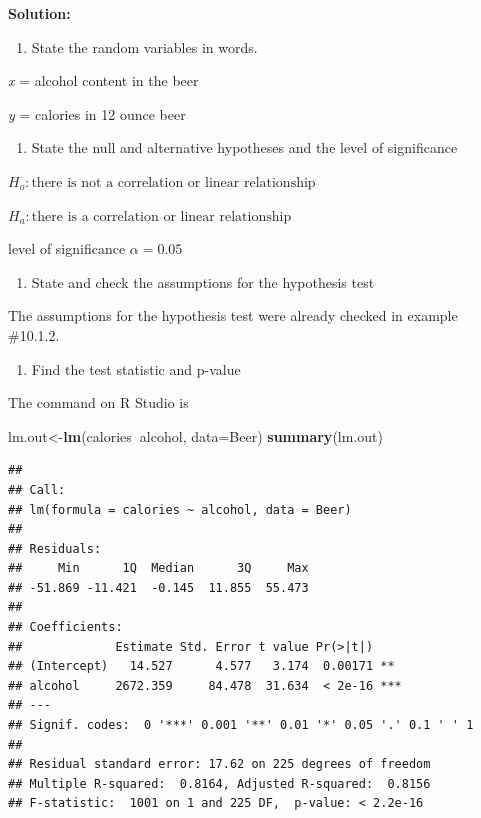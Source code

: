 \documentclass[
]{book}
\newenvironment{Shaded}{\begin{snugshade}}{\end{snugshade}}
\newcommand{\DataTypeTok}[1]{\textcolor[rgb]{0.13,0.29,0.53}{#1}}
\newcommand{\KeywordTok}[1]{\textcolor[rgb]{0.13,0.29,0.53}{\textbf{#1}}}
\newcommand{\NormalTok}[1]{#1}
\newcommand{\OperatorTok}[1]{\textcolor[rgb]{0.81,0.36,0.00}{\textbf{#1}}}
\providecommand{\tightlist}{%
  \setlength{\itemsep}{0pt}\setlength{\parskip}{0pt}}
\begin{document}
\textbf{Solution:}

\begin{enumerate}
\def\labelenumi{\arabic{enumi}.}
\tightlist
\item
  State the random variables in words.
\end{enumerate}

\emph{x} = alcohol content in the beer

\emph{y} = calories in 12 ounce beer

\begin{enumerate}
\def\labelenumi{\arabic{enumi}.}
\setcounter{enumi}{1}
\tightlist
\item
  State the null and alternative hypotheses and the level of significance
\end{enumerate}

\(H_o: \text{there is not a correlation or linear relationship}\)

\(H_a: \text{there is a correlation or linear relationship}\)

level of significance \(\alpha=0.05\)

\begin{enumerate}
\def\labelenumi{\arabic{enumi}.}
\setcounter{enumi}{2}
\tightlist
\item
  State and check the assumptions for the hypothesis test
\end{enumerate}

The assumptions for the hypothesis test were already checked in example \#10.1.2.

\begin{enumerate}
\def\labelenumi{\arabic{enumi}.}
\setcounter{enumi}{3}
\tightlist
\item
  Find the test statistic and p-value
\end{enumerate}

The command on R Studio is

\begin{Shaded}
\begin{Highlighting}[]
\NormalTok{lm.out<-}\KeywordTok{lm}\NormalTok{(calories}\OperatorTok{~}\NormalTok{alcohol, }\DataTypeTok{data=}\NormalTok{Beer)}
\KeywordTok{summary}\NormalTok{(lm.out)}
\end{Highlighting}
\end{Shaded}

\begin{verbatim}
## 
## Call:
## lm(formula = calories ~ alcohol, data = Beer)
## 
## Residuals:
##     Min      1Q  Median      3Q     Max 
## -51.869 -11.421  -0.145  11.855  55.473 
## 
## Coefficients:
##             Estimate Std. Error t value Pr(>|t|)    
## (Intercept)   14.527      4.577   3.174  0.00171 ** 
## alcohol     2672.359     84.478  31.634  < 2e-16 ***
## ---
## Signif. codes:  0 '***' 0.001 '**' 0.01 '*' 0.05 '.' 0.1 ' ' 1
## 
## Residual standard error: 17.62 on 225 degrees of freedom
## Multiple R-squared:  0.8164, Adjusted R-squared:  0.8156 
## F-statistic:  1001 on 1 and 225 DF,  p-value: < 2.2e-16
\end{verbatim}
\end{document}
